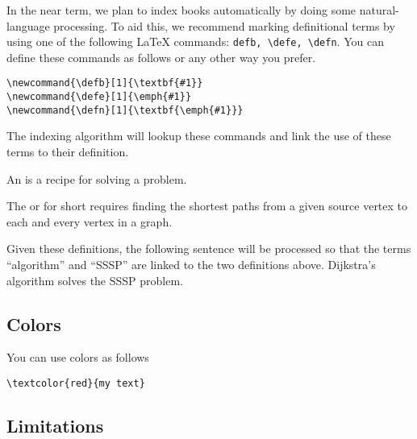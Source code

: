 \begin{flex}
In the near term, we plan to index books automatically by doing some natural-language processing.  
%
To aid this, we recommend marking definitional terms by using one of the following LaTeX commands: \lstinline`defb, \defe, \defn`.  You can define these commands as follows or any other way you prefer.
%
\begin{lstlisting}
\newcommand{\defb}[1]{\textbf{#1}}
\newcommand{\defe}[1]{\emph{#1}}
\newcommand{\defn}[1]{\textbf{\emph{#1}}}
\end{lstlisting}
%
The indexing algorithm will lookup these commands and link the use of these terms to their definition.

\begin{example}
\begin{definition}[Algorithm]
\label{def:algorithm}
An  is a recipe for solving a problem.
\end{definition}


\begin{definition}
\label{def:sssp}
The  or  for short requires finding  the shortest paths from a given source vertex to each and every vertex in a graph. 
\end{definition}

Given these definitions, the following sentence will be processed so that the terms ``algorithm'' and ``SSSP'' are linked to the two definitions above.
%
Dijkstra's algorithm solves the SSSP problem.
\end{example}
\end{flex}

\subsection{Colors}

You can use colors as follows
\begin{lstlisting}
\textcolor{red}{my text}
\end{lstlisting}

\subsection{Limitations}
\label{sec:mtl::limitations}

